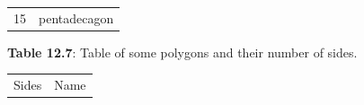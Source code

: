 {{\begin{center}
\begin{tabular}[t]{|l|l|}
    
        15 &
    
    
        pentadecagon%
     \tabularnewline\cline{1-1}\cline{2-2}
    \end{tabular}
      \end{center}
    \begin{center}{\small\bfseries Table 12.7}: Table of some polygons and their number of sides.\end{center}
    
    \addtocounter{footnote}{-0}
    
          }{ %
        
    
        \begin{center}
      
      \label{m39368*uid92}
      
    \noindent
      \tablelasttail{}
      \begin{xtabular}[t]{|l|l|}\hline
    
    
        Sides &
    
    
        Name%
     \tabularnewline{}
    

\end{xtabular}
\end{center}}}
